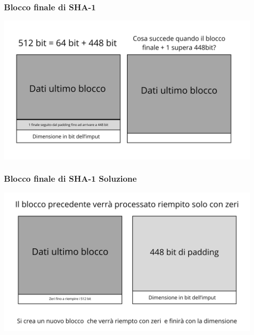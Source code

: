 \begin{frame}
	\frametitle{Blocco finale di SHA-1}
	\begin{center}
		\includegraphics[width=1\textwidth]{img/3-img/blocco-finale1.png}
	\end{center}

\end{frame}

\begin{frame}
	\frametitle{Blocco finale di SHA-1 Soluzione}
	\begin{center}
		\includegraphics[width=1\textwidth]{img/3-img/blocco-finale2.png}
	\end{center}

\end{frame}